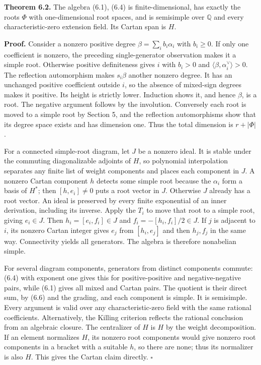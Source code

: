 \documentclass[11pt,a4paper,openany]{report}
\newcounter{none}
\begin{document}
\textbf{Theorem 6.2.} The algebra (6.1), (6.4) is finite-dimensional, has exactly the roots \(\Phi\) with one-dimensional root spaces, and is semisimple over \(\mathbb Q\) and every characteristic-zero extension field. Its Cartan span is \(H\).

\textbf{Proof.} Consider a nonzero positive degree \(\beta=\sum_i b_i\alpha_i\) with \(b_i\ge0\). If only one coefficient is nonzero, the preceding single-generator observation makes it a simple root. Otherwise positive definiteness gives \(i\) with \(b_i>0\) and \(\langle\beta,\alpha_i^\vee\rangle>0\). The reflection automorphism makes \(s_i\beta\) another nonzero degree. It has an unchanged positive coefficient outside \(i\), so the absence of mixed-sign degrees makes it positive. Its height is strictly lower. Induction shows it, and hence \(\beta\), is a root. The negative argument follows by the involution. Conversely each root is moved to a simple root by Section 5, and the reflection automorphisms show that its degree space exists and has dimension one. Thus the total dimension is \(r+|\Phi|\).

For a connected simple-root diagram, let \(J\) be a nonzero ideal. It is stable under the commuting diagonalizable adjoints of \(H\), so polynomial interpolation separates any finite list of weight components and places each component in \(J\). A nonzero Cartan component \(h\) detects some simple root because the \(\alpha_i\) form a basis of \(H^*\); then \([h,e_i]\ne0\) puts a root vector in \(J\). Otherwise \(J\) already has a root vector. An ideal is preserved by every finite exponential of an inner derivation, including its inverse. Apply the \(T_i\) to move that root to a simple root, giving \(e_i\in J\). Then \(h_i=[e_i,f_i]\in J\) and \(f_i=-[h_i,f_i]/2\in J\). If \(j\) is adjacent to \(i\), its nonzero Cartan integer gives \(e_j\) from \([h_i,e_j]\) and then \(h_j,f_j\) in the same way. Connectivity yields all generators. The algebra is therefore nonabelian simple.

For several diagram components, generators from distinct components commute: (6.4) with exponent one gives this for positive-positive and negative-negative pairs, while (6.1) gives all mixed and Cartan pairs. The quotient is their direct sum, by (6.6) and the grading, and each component is simple. It is semisimple. Every argument is valid over any characteristic-zero field with the same rational coefficients. Alternatively, the Killing criterion reflects the rational conclusion from an algebraic closure. The centralizer of \(H\) is \(H\) by the weight decomposition. If an element normalizes \(H\), its nonzero root components would give nonzero root components in a bracket with a suitable \(h\), so there are none; thus its normalizer is also \(H\). This gives the Cartan claim directly. \(\square\)
\end{document}
